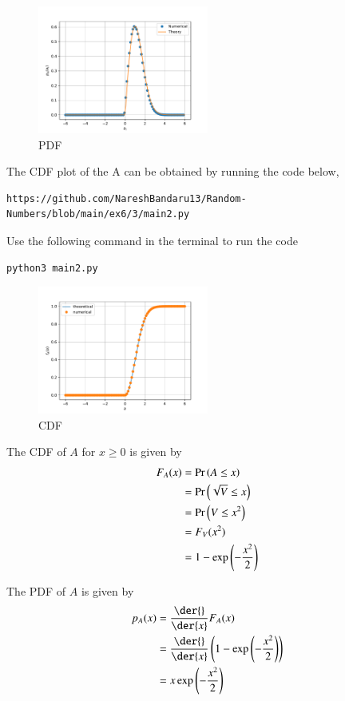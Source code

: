 \documentclass[journal,12pt,twocolumn]{IEEEtran}
\renewcommand\thesection{\arabic{section}}
\begin{document}
\begin{enumerate}[label=\thesection.\arabic*
,ref=\thesection.\theenumi]
\begin{figure}[H]
\includegraphics[width=0.5\textwidth]{a_pdf.pdf}
\caption{PDF}
\label{fig:A_PDF}
\end{figure}
The CDF plot of the A can be obtained by running the code below,
\begin{lstlisting}
https://github.com/NareshBandaru13/Random-Numbers/blob/main/ex6/3/main2.py
\end{lstlisting}
Use the following command in the terminal to run the code
\begin{lstlisting}
python3 main2.py
\end{lstlisting}
\begin{figure}[H]
\includegraphics[width=0.5\textwidth]{a_cdf.pdf}
\caption{CDF}
\label{fig:A_cDF}
\end{figure}

	The CDF of $A$ for $x \ge 0$ is given by
	\begin{align*}
		F_A(x) &= \Pr\left(A \le x\right) \\
		&= \Pr\left(\sqrt{V} \le x\right) \\
		&= \Pr\left(V \le x^2\right) \\
		&= F_V(x^2) \\
		&= 1 - \exp\left(-\frac{x^2}{2}\right)
	\end{align*}
	
	The PDF of $A$ is given by
	\begin{align*}
		p_A(x) &= \frac{\der{}}{\der{x}} F_A(x) \\
		&= \frac{\der{}}{\der{x}} \brak{1 - \exp\brak{-\frac{x^2}{2}}} \\
		&= x \exp\brak{-\frac{x^2}{2}}
	\end{align*}
	

\end{enumerate}
\end{document}
